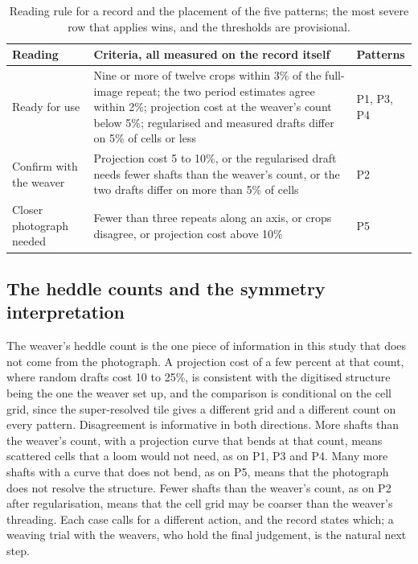 \documentclass[12pt]{article}
\begin{document}
\begin{table}[htbp]
\caption{Reading rule for a record and the placement of the five patterns; the most severe row that applies wins, and the thresholds are provisional.}
\label{tab:rule}
\small
\renewcommand{\arraystretch}{1.1}
\begin{tabular}{L{2.6cm}L{8.6cm}L{2.9cm}}
Reading & Criteria, all measured on the record itself & Patterns \\ \midrule
Ready for use & Nine or more of twelve crops within 3\% of the full-image repeat; the two period estimates agree within 2\%; projection cost at the weaver's count below 5\%; regularised and measured drafts differ on 5\% of cells or less & P1, P3, P4 \\
Confirm with the weaver & Projection cost 5 to 10\%, or the regularised draft needs fewer shafts than the weaver's count, or the two drafts differ on more than 5\% of cells & P2 \\
Closer photograph needed & Fewer than three repeats along an axis, or crops disagree, or projection cost above 10\% & P5 \\
\end{tabular}
\end{table}

\subsection{The heddle counts and the symmetry interpretation}

The weaver's heddle count is the one piece of information in this study that does not come from the photograph. A projection cost of a few percent at that count, where random drafts cost 10 to 25\%, is consistent with the digitised structure being the one the weaver set up, and the comparison is conditional on the cell grid, since the super-resolved tile gives a different grid and a different count on every pattern. Disagreement is informative in both directions. More shafts than the weaver's count, with a projection curve that bends at that count, means scattered cells that a loom would not need, as on P1, P3 and P4. Many more shafts with a curve that does not bend, as on P5, means that the photograph does not resolve the structure. Fewer shafts than the weaver's count, as on P2 after regularisation, means that the cell grid may be coarser than the weaver's threading. Each case calls for a different action, and the record states which; a weaving trial with the weavers, who hold the final judgement, is the natural next step.
\end{document}
